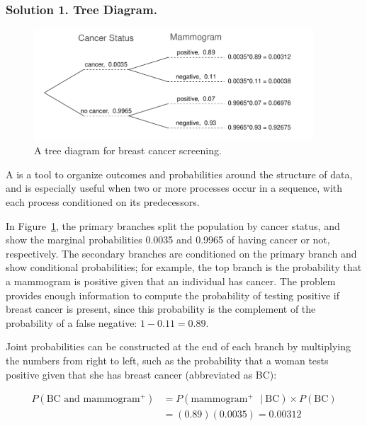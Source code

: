 \subsubsection{Solution 1. Tree Diagram.}

\begin{figure}[h]
	\centering
	\includegraphics[width=0.93\textwidth]{ch_probability_oi_biostat/figures/BreastCancerTreeDiagram/BreastCancerTreeDiagram}
	\caption{A tree diagram for breast cancer screening.}
	\label{BreastCancerTreeDiagram}
\end{figure}

A  is a tool to organize outcomes and probabilities around the structure of data, and is especially useful when two or more processes occur in a sequence, with each process  conditioned on its predecessors. 

In Figure~\ref{BreastCancerTreeDiagram}, the primary branches split the population by cancer status, and show the marginal probabilities 0.0035 and 0.9965 of having cancer or not, respectively. The secondary branches are conditioned on the primary branch and show conditional probabilities; for example, the top branch is the probability that a mammogram is positive given that an individual has cancer. The problem provides enough information to compute the probability of testing positive if breast cancer is present, since this probability is the complement of the probability of a false negative: $1 - 0.11 = 0.89$.

Joint probabilities can be constructed at the end of each branch by multiplying the numbers from right to left, such as the probability that a woman tests positive given that she has breast cancer (abbreviated as BC):

\begin{align*}
P(\text{BC and mammogram$^+$}) &= P(\text{mammogram$^+$ } |\ \text{BC}) \times  P(\text{BC}) \\
	&= (0.89) (0.0035) = 0.00312
\end{align*}


